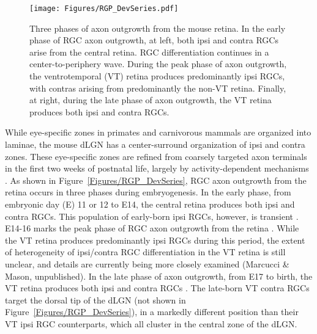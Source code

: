 \begin{figure}[hbtp]
    \begin{center}
        \texttt{[image: Figures/RGP\_DevSeries.pdf]}
        \caption[Three phases of axon outgrowth from the mouse retina.]
        {Three phases of axon outgrowth from the mouse retina.
        In the early phase of RGC axon outgrowth, at left, both ipsi and contra RGCs arise from the central retina.
        RGC differentiation continues in a center-to-periphery wave.
        During the peak phase of axon outgrowth, the ventrotemporal (VT) retina produces predominantly ipsi RGCs, with contras arising from predominantly the non-VT retina.
        Finally, at right, during the late phase of axon outgrowth, the VT retina produces both ipsi and contra RGCs.}
        \label{Figures/RGPDevSeries}
    \end{center}
\end{figure}
While eye-specific zones in primates and carnivorous mammals are organized into laminae, the mouse dLGN has a center-surround organization of ipsi and contra zones.
These eye-specific zones are refined from coarsely targeted axon terminals in the first two weeks of postnatal life, largely by activity-dependent mechanisms \cite{huberman2008mechanisms,feldheim2010visual}.
As shown in Figure~\ref{Figures/RGP_DevSeries}, RGC axon outgrowth from the retina occurs in three phases during embryogenesis.
In the early phase, from embryonic day (E) 11 or 12 to E14, the central retina produces both ipsi and contra RGCs.
This population of early-born ipsi RGCs, however, is transient \cite{drager1985birth,colello1990early,soares2015transient}.
E14-16 marks the peak phase of RGC axon outgrowth from the retina \cite{drager1985birth,petros2008retinal}.
While the VT retina produces predominantly ipsi RGCs during this period, the extent of heterogeneity of ipsi/contra RGC differentiation in the VT retina is still unclear, and details are currently being more closely examined (Marcucci \& Mason, unpublished).
In the late phase of axon outgrowth, from E17 to birth, the VT retina produces both ipsi and contra RGCs \cite{drager1985birth,petros2008retinal}.
The late-born VT contra RGCs target the dorsal tip of the dLGN (not shown in Figure~\ref{Figures/RGP_DevSeries}), in a markedly different position than their VT ipsi RGC counterparts, which all cluster in the central zone of the dLGN.
